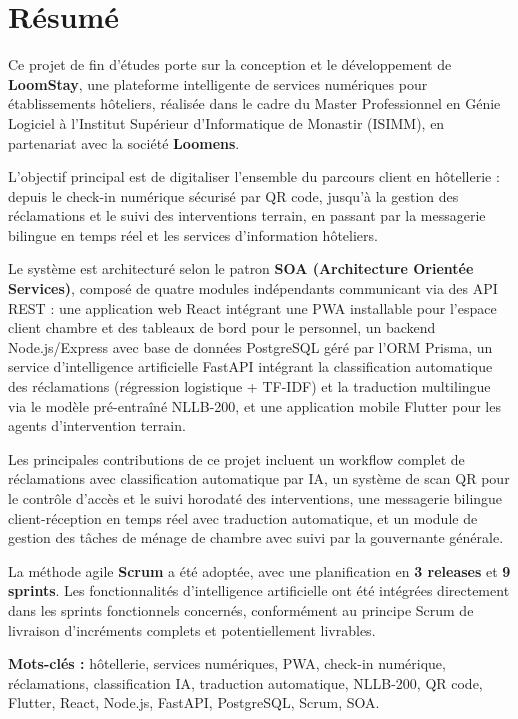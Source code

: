 
\chapter*{Résumé}

Ce projet de fin d'études porte sur la conception et le développement de \textbf{LoomStay}, une plateforme intelligente de services numériques pour établissements hôteliers, réalisée dans le cadre du Master Professionnel en Génie Logiciel à l'Institut Supérieur d'Informatique de Monastir (ISIMM), en partenariat avec la société \textbf{Loomens}.

L'objectif principal est de digitaliser l'ensemble du parcours client en hôtellerie : depuis le check-in numérique sécurisé par QR code, jusqu'à la gestion des réclamations et le suivi des interventions terrain, en passant par la messagerie bilingue en temps réel et les services d'information hôteliers.

Le système est architecturé selon le patron \textbf{SOA (Architecture Orientée Services)}, composé de quatre modules indépendants communicant via des API REST : une application web React intégrant une PWA installable pour l'espace client chambre et des tableaux de bord pour le personnel, un backend Node.js/Express avec base de données PostgreSQL géré par l'ORM Prisma, un service d'intelligence artificielle FastAPI intégrant la classification automatique des réclamations (régression logistique + TF-IDF) et la traduction multilingue via le modèle pré-entraîné NLLB-200, et une application mobile Flutter pour les agents d'intervention terrain.

Les principales contributions de ce projet incluent un workflow complet de réclamations avec classification automatique par IA, un système de scan QR pour le contrôle d'accès et le suivi horodaté des interventions, une messagerie bilingue client-réception en temps réel avec traduction automatique, et un module de gestion des tâches de ménage de chambre avec suivi par la gouvernante générale.

La méthode agile \textbf{Scrum} a été adoptée, avec une planification en \textbf{3 releases} et \textbf{9 sprints}. Les fonctionnalités d'intelligence artificielle ont été intégrées directement dans les sprints fonctionnels concernés, conformément au principe Scrum de livraison d'incréments complets et potentiellement livrables.

\vspace{0.5cm}
\textbf{Mots-clés :} hôtellerie, services numériques, PWA, check-in numérique, réclamations, classification IA, traduction automatique, NLLB-200, QR code, Flutter, React, Node.js, FastAPI, PostgreSQL, Scrum, SOA.

\newpage
